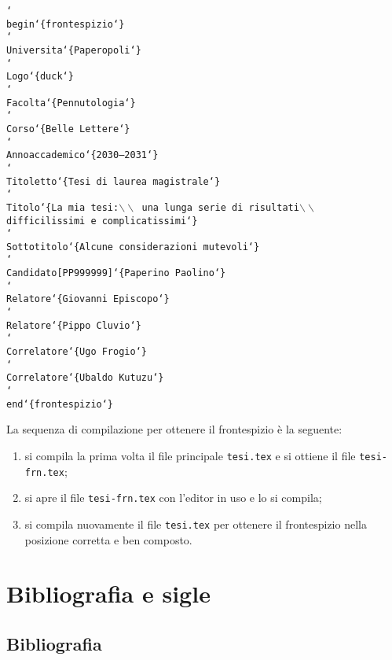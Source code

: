 \documentclass{suftesi}
\DeclareRobustCommand*{\cs}[1]{\texttt{\char`\\#1}}
\DeclareRobustCommand*{\ar}[1]{\texttt{\char`\{#1\char`\}}}
\DeclareRobustCommand*{\oar}[1]{\texttt{[#1]}}
\newcommand*{\File}{\texttt}
\newenvironment{ttquote}
  {\genquote[\ttfamily\microtypesetup{activate=false}]}
  {\endgenquote}
\begin{document}
\begin{ttquote}
\cs{begin}\ar{frontespizio}\\
 \cs{Universita}\ar{Paperopoli}\\
 \cs{Logo}\ar{duck}\\
 \cs{Facolta}\ar{Pennutologia}\\
 \cs{Corso}\ar{Belle Lettere}\\
 \cs{Annoaccademico}\ar{2030--2031}\\
 \cs{Titoletto}\ar{Tesi di laurea magistrale}\\
 \cs{Titolo}\ar{La mia tesi:$\backslash\backslash$ una lunga serie di risultati$\backslash\backslash$\\       difficilissimi e complicatissimi}\\
 \cs{Sottotitolo}\ar{Alcune considerazioni mutevoli}\\
 \cs{Candidato}\oar{PP999999}\ar{Paperino Paolino}\\
 \cs{Relatore}\ar{Giovanni Episcopo}\\
 \cs{Relatore}\ar{Pippo Cluvio}\\
 \cs{Correlatore}\ar{Ugo Frogio}\\
 \cs{Correlatore}\ar{Ubaldo Kutuzu}\\
 \cs{end}\ar{frontespizio}
\end{ttquote}
\enlargethispage{2\baselineskip}

La sequenza di compilazione per ottenere il frontespizio è la seguente:
\begin{enumerate}
\item si compila la prima volta il file principale \File{tesi.tex} e si ottiene il file \File{tesi-frn.tex}; 
\item si apre il file \File{tesi-frn.tex} con l'editor in uso e lo si compila;
\item si compila nuovamente il file \File{tesi.tex} per ottenere il frontespizio nella posizione corretta e ben composto.
\end{enumerate}

\chapter{Bibliografia e sigle} 

\section{Bibliografia}
\end{document}
